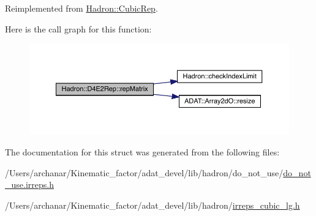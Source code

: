 Reimplemented from \mbox{\hyperlink{structHadron_1_1CubicRep_ac5d7e9e6f4ab1158b5fce3e4ad9e8005}{Hadron\+::\+Cubic\+Rep}}.

Here is the call graph for this function\+:
\nopagebreak
\begin{figure}[H]
\begin{center}
\leavevmode
\includegraphics[width=350pt]{d5/da6/structHadron_1_1D4E2Rep_ae07926c0c41e03ed930683eb4e9be5f5_cgraph}
\end{center}
\end{figure}


The documentation for this struct was generated from the following files\+:\begin{DoxyCompactItemize}
\item 
/\+Users/archanar/\+Kinematic\+\_\+factor/adat\+\_\+devel/lib/hadron/do\+\_\+not\+\_\+use/\mbox{\hyperlink{do__not__use_8irreps_8h}{do\+\_\+not\+\_\+use.\+irreps.\+h}}\item 
/\+Users/archanar/\+Kinematic\+\_\+factor/adat\+\_\+devel/lib/hadron/\mbox{\hyperlink{lib_2hadron_2irreps__cubic__lg_8h}{irreps\+\_\+cubic\+\_\+lg.\+h}}\end{DoxyCompactItemize}
